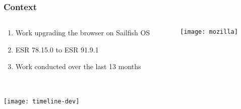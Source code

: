 \documentclass[
	notes=none,
	aspectratio=169
]{beamer}
\begin{document}
\begin{frame}
\frametitle{Context}

\begin{columns}[T]
\begin{column}[T]{0.5\textwidth}
\setlength{\parskip}{0.5em}

\vspace{1.5cm}
\begin{enumerate}
\setlength{\parskip}{0.5em}
\item Work upgrading the browser on Sailfish OS
\item ESR 78.15.0 to ESR 91.9.1
\item Work conducted over the last 13 months
\end{enumerate}

\end{column}
\begin{column}[T]{0.5\textwidth}
\setlength{\parskip}{0.5em}

\vspace{0.5cm}
\texttt{[image: mozilla]}

\end{column}
\end{columns}

\end{frame}
\note{
\begin{enumerate}
\item -
\end{enumerate}
}


\begin{frame}
\frametitle{}

\begin{columns}[T]
\begin{column}[T]{1.13\textwidth}

\vspace{0.0cm}
\texttt{[image: timeline-dev]}

\end{column}
\end{columns}

\end{frame}

\end{document}
